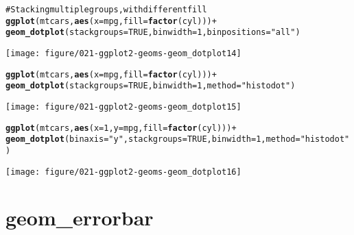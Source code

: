 \documentclass[a4paper,titlepage]{tufte-handout}\usepackage{graphicx, color}
\makeatletter
\def\maxwidth{ %
  \ifdim\Gin@nat@width>\linewidth
    \linewidth
  \else
    \Gin@nat@width
  \fi
}
\newcommand{\hlfunctioncall}[1]{\textcolor[rgb]{0.501960784313725,0,0.329411764705882}{\textbf{#1}}}%
\newcommand{\hlstring}[1]{\textcolor[rgb]{0.6,0.6,1}{#1}}%
\newcommand{\hlcomment}[1]{\textcolor[rgb]{0.180392156862745,0.6,0.341176470588235}{#1}}%
\newenvironment{kframe}{%
 \def\at@end@of@kframe{}%
 \ifinner\ifhmode%
  \def\at@end@of@kframe{\end{minipage}}%
  \begin{minipage}{\columnwidth}%
 \fi\fi%
 \def\FrameCommand##1{\hskip\@totalleftmargin \hskip-\fboxsep
 \colorbox{shadecolor}{##1}\hskip-\fboxsep
     \hskip-\linewidth \hskip-\@totalleftmargin \hskip\columnwidth}%
 \MakeFramed {\advance\hsize-\width
   \@totalleftmargin\z@ \linewidth\hsize
   \@setminipage}}%
 {\par\unskip\endMakeFramed%
 \at@end@of@kframe}
\newenvironment{knitrout}{}{} %
\makeatother
\begin{document}
\begin{knitrout}
\begin{kframe}
\begin{alltt}
\hlcomment{# Stacking multiple groups, with different fill}
\hlfunctioncall{ggplot}(mtcars, \hlfunctioncall{aes}(x = mpg, fill = \hlfunctioncall{factor}(cyl))) +
  \hlfunctioncall{geom_dotplot}(stackgroups = TRUE, binwidth = 1, binpositions = \hlstring{"all"})
\end{alltt}
\end{kframe}
\texttt{[image: figure/021-ggplot2-geoms-geom\_dotplot14]} 
\begin{kframe}\begin{alltt}

\hlfunctioncall{ggplot}(mtcars, \hlfunctioncall{aes}(x = mpg, fill = \hlfunctioncall{factor}(cyl))) +
  \hlfunctioncall{geom_dotplot}(stackgroups = TRUE, binwidth = 1, method = \hlstring{"histodot"})
\end{alltt}
\end{kframe}
\texttt{[image: figure/021-ggplot2-geoms-geom\_dotplot15]} 
\begin{kframe}\begin{alltt}

\hlfunctioncall{ggplot}(mtcars, \hlfunctioncall{aes}(x = 1, y = mpg, fill = \hlfunctioncall{factor}(cyl))) +
  \hlfunctioncall{geom_dotplot}(binaxis = \hlstring{"y"}, stackgroups = TRUE, binwidth = 1, method = \hlstring{"histodot"})
\end{alltt}
\end{kframe}
\texttt{[image: figure/021-ggplot2-geoms-geom\_dotplot16]} 
\begin{kframe}\begin{alltt}


\end{alltt}
\end{kframe}
\end{knitrout}



\section{geom\_errorbar}
\end{document}
